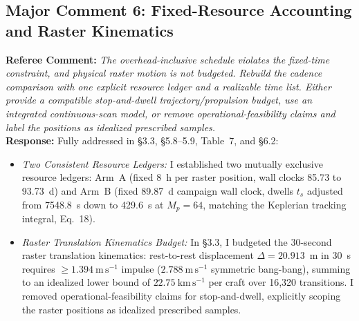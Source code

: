 \documentclass[11pt]{article}
\begin{document}
\subsection*{Major Comment 6: Fixed-Resource Accounting and Raster Kinematics}
\textbf{Referee Comment:} \textit{The overhead-inclusive schedule violates the fixed-time constraint, and physical raster motion is not budgeted. Rebuild the cadence comparison with one explicit resource ledger and a realizable time list. Either provide a compatible stop-and-dwell trajectory/propulsion budget, use an integrated continuous-scan model, or remove operational-feasibility claims and label the positions as idealized prescribed samples.}\\
\textbf{Response:} Fully addressed in §3.3, §5.8--5.9, Table~7, and §6.2:
\begin{itemize}
    \item \textit{Two Consistent Resource Ledgers:} I established two mutually exclusive resource ledgers: Arm~A (fixed 8~h per raster position, wall clocks 85.73 to 93.73~d) and Arm~B (fixed 89.87~d campaign wall clock, dwells $t_s$ adjusted from 7548.8~s down to 429.6~s at $M_p=64$, matching the Keplerian tracking integral, Eq.~18).
    \item \textit{Raster Translation Kinematics Budget:} In §3.3, I budgeted the 30-second raster translation kinematics: rest-to-rest displacement $\Delta = 20.913$~m in 30~s requires $\ge 1.394\ \mathrm{m\,s^{-1}}$ impulse ($2.788\ \mathrm{m\,s^{-1}}$ symmetric bang-bang), summing to an idealized lower bound of $22.75\ \mathrm{km\,s^{-1}}$ per craft over 16,320 transitions. I removed operational-feasibility claims for stop-and-dwell, explicitly scoping the raster positions as idealized prescribed samples.
\end{itemize}
\end{document}
